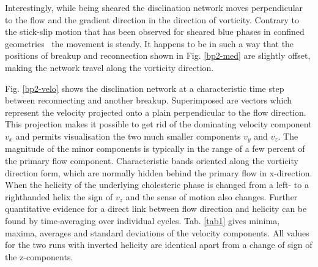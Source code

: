 \documentclass[aps,pre,reprint,superscriptaddress]{revtex4}
\begin{document}
Interestingly, while being sheared the disclination network moves perpendicular to the flow and 
the gradient direction in the direction of vorticity.
Contrary to the stick-slip motion that has been observed for sheared blue phases in confined
geometries~\cite{Henrich:2012b} the movement is steady. It happens to be in such a way that the 
positions of breakup and reconnection shown in Fig. \ref{bp2-med} are slightly offset, 
making the network travel along the vorticity direction.

Fig. \ref{bp2-velo} shows the disclination network at a characteristic time step between reconnecting and another breakup.
Superimposed are vectors which represent the velocity projected onto a plain perpendicular to the flow direction.
This projection makes it possible to get rid of the dominating velocity component $v_x$ and permits visualisation the 
two much smaller components $v_y$ and $v_z$.
The magnitude of the minor components is typically in the range of a few percent of the primary flow component.
Characteristic bands oriented along the vorticity direction form, which are normally hidden behind the primary flow in x-direction.
When the helicity of the underlying cholesteric phase is changed from a left- to a righthanded helix the sign of $v_z$ 
and the sense of motion also changes.
Further quantitative evidence for a direct link between flow direction and helicity can be found by time-averaging over
individual cycles.
Tab. \ref{tab1} gives minima, maxima, averages and standard deviations of the velocity components.
All values for the two runs with inverted helicity are identical apart from a change of sign of the z-components.
\end{document}
